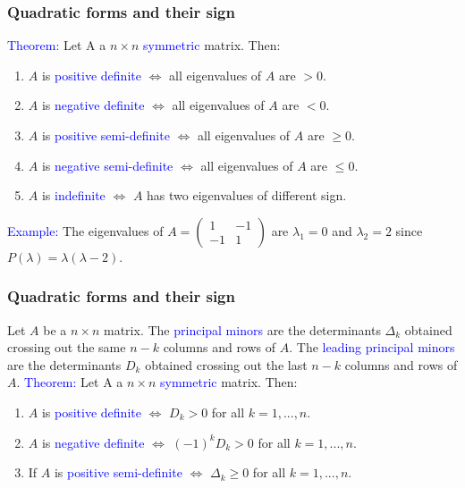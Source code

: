 \documentclass[11pt,aspectratio=169]{beamer}
\begin{document}
\begin{frame}
\frametitle{Quadratic forms and their sign}
\begin{small}
\textcolor{blue}{Theorem:} Let A a $n \times n$ \textcolor{blue}{symmetric} matrix.
Then:
\begin{enumerate}
\item $A$ is \textcolor{blue}{positive definite} $\Longleftrightarrow$ all eigenvalues of $A$ are $>0$.

\item $A$ is \textcolor{blue}{negative definite} $\Longleftrightarrow$  all eigenvalues of $A$ are $<0$.
\item $A$ is \textcolor{blue}{positive semi-definite} $\Longleftrightarrow$ all eigenvalues of $A$ are $\geq0$.
\item $A$ is \textcolor{blue}{negative semi-definite} $\Longleftrightarrow$  all eigenvalues of $A$ are $ \leq0$.
	\item$A$ is \textcolor{blue}{indefinite} $\Longleftrightarrow$  $A$ has two eigenvalues of different sign.
\end{enumerate}
\vskip 12pt
\textcolor{blue}{Example:}
The eigenvalues of $A=\begin{pmatrix} 1 & -1 \\ -1 & 1 \end{pmatrix}$ are $\lambda_1=0$ and $\lambda_2=2$ since  $P(\lambda)=\lambda(\lambda-2)$.


\end{small}
\end{frame}\begin{frame}
\frametitle{Quadratic forms and their sign}
\begin{small}
Let $A$ be a $n \times n $ matrix. The \textcolor{blue}{principal minors}  are the determinants $\Delta_k$ obtained crossing out the same $n-k$ columns and rows of $A$. The \textcolor{blue}{leading principal minors}  are the determinants $D_k$ obtained crossing out the last $n-k$ columns and rows of $A$.
\vskip 10pt
\textcolor{blue}{Theorem:} Let A a $n \times n$ \textcolor{blue}{symmetric} matrix.
Then:
\begin{enumerate}
\item $A$ is \textcolor{blue}{positive definite} $\Longleftrightarrow$ $D_k>0$ for all $k=1,...,n$.

\item $A$ is \textcolor{blue}{negative definite} $\Longleftrightarrow$ $(-1)^k D_k>0$ for all $k=1,...,n$.

\item If $A$ is \textcolor{blue}{positive semi-definite} $\Longleftrightarrow$ $\Delta_k\geq 0$ for all $k=1,...,n$.


\end{enumerate}
\end{small}
\end{frame}
\end{document}
